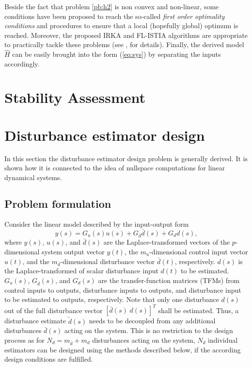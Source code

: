 \documentclass[graybox]{svmult}
\begin{document}
Beside the fact that problem \eqref{pb:h2} is non convex and non-linear, some conditions have been proposed to reach the so-called \emph{first order optimality conditions} and procedures to ensure that a local (hopefully global) optimum is reached. Moreover, the proposed IRKA and FL-ISTIA algorithms are appropriate to practically tackle these problems (see \eg, \cite{GugercinSIAM:2008,VuilleminPhD:2014} for details). %
Finally, the derived  model $\hat H$ can be easily brought into the form (\ref{eq:sys}) by separating the inputs accordingly.


\section{Stability Assessment}\label{sec:st}






\section{Disturbance estimator design}\label{sec:th}
In this section the disturbance estimator design problem is generally derived. It is shown how it is connected to the idea of nullspace computations for linear dynamical systems. 

\subsection{Problem formulation}
Consider the linear model described by the input-output form
\begin{equation}\label{eq:sys}
	y(s) = G_u(s) u(s) + G_{\bar d} \bar d(s)  + G_d d(s),
\end{equation}
where $y(s)$, $u(s)$, and $\bar d(s)$  are the Laplace-transformed
vectors of the $p$-dimensional system output vector $y(t)$, the $m_u$-dimensional control input vector $u(t)$, and the $m_{\bar d}$-dimensional disturbance vector $\bar d(t)$, respectively. $d(s)$ is the Laplace-transformed of scalar  disturbance input $d(t)$ to be estimated.
$G_u(s)$, $G_{\bar d}(s)$, and $G_d(s)$ are the transfer-function matrices (TFMs) from
control inputs to  outputs, disturbance inputs to outputs, and disturbance input to be estimated  to outputs, respectively. Note that only one disturbance $d(s)$ out of the full disturbance vector $[ \bar d(s) \; d(s)]^T$ shall be estimated.  Thus, a disturbance estimate $\tilde d(s)$ needs to be decoupled from any additional disturbances $\bar d(s)$ acting on the system. This is no restriction to the design process as for $N_d = m_{\bar d} + m_d$ disturbances acting on the system, $N_d$ individual estimators can be designed using the methods described below, if the according design conditions are fulfilled.
\end{document}

